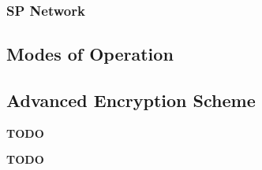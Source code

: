 \subsubsection{SP Network}\label{subsubsec:SP_Network}

\subsection{Modes of Operation}\label{subsec:Modes_of_Operation}
\begin{definition}\label{def:Mode_of_Operation}
  
\end{definition}

\subsection{Advanced Encryption Scheme}\label{subsec:AES}
\textbf{TODO}
\begin{definition}\label{def:AES}
  \textbf{TODO}
\end{definition}

